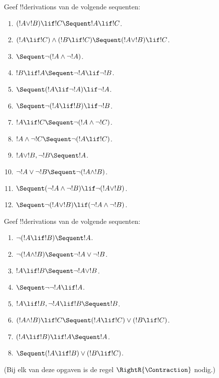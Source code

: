 \documentclass[../../../include/open-logic-section]{subfiles}
\begin{document}
\begin{prob}
Geef !!{derivation}s van de volgende sequenten:
\begin{enumerate}
\item $(!A \lor !B) \lif !C \Sequent !A \lif !C$.
\item $(!A \lif !C) \land (!B \lif !C) \Sequent (!A \lor !B) \lif !C$.
\item $\Sequent \lnot(!A \land \lnot !A)$.
\item $!B \lif !A \Sequent \lnot !A \lif \lnot !B$.
\item $\Sequent (!A \lif \lnot !A) \lif \lnot !A$.
\item $\Sequent \lnot(!A \lif !B) \lif \lnot !B$.
\item $!A \lif !C \Sequent \lnot (!A \land \lnot !C)$.
\item $!A \land \lnot !C \Sequent \lnot (!A \lif !C)$.
\item $!A \lor !B, \lnot !B \Sequent !A$.
\item $\lnot !A \lor \lnot !B \Sequent \lnot(!A \land !B)$.
\item $\Sequent (\lnot !A \land \lnot !B) \lif\lnot(!A \lor !B)$.
\item $\Sequent \lnot(!A \lor !B) \lif (\lnot !A \land \lnot !B)$.
\end{enumerate}
\end{prob}

\begin{prob}
Geef !!{derivation}s van de volgende sequenten:
\begin{enumerate}
\item $\lnot(!A \lif !B) \Sequent !A$.
\item $\lnot(!A \land !B) \Sequent \lnot !A \lor \lnot !B$.
\item $!A \lif !B \Sequent \lnot !A \lor !B$.
\item $\Sequent \lnot \lnot !A \lif !A$.
\item $!A \lif !B, \lnot !A \lif !B \Sequent !B$.
\item $(!A \land !B) \lif !C \Sequent (!A \lif !C) \lor (!B \lif !C)$.
\item $(!A \lif !B) \lif !A \Sequent !A$.
\item $\Sequent (!A \lif !B) \lor (!B \lif !C)$.
\end{enumerate}
(Bij elk van deze opgaven is de regel $\RightR{\Contraction}$ nodig.)
\end{prob}
\end{document}
